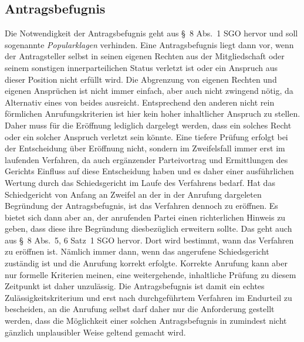 \subsection{Antragsbefugnis}
\label{Anrufung:Kriterien:Antragsbefugnis}
Die Notwendigkeit der Antragsbefugnis geht aus \S~8 Abs.~1 SGO hervor und soll sogenannte \emph{Popularklagen} verhinden.
Eine Antragsbefugnis liegt dann vor, wenn der Antragsteller selbst in seinen eigenen Rechten aus der Mitgliedschaft oder seinem sonstigen innerparteilichen Status verletzt ist oder ein Anspruch aus dieser Position nicht erfüllt wird.
Die Abgrenzung von eigenen Rechten und eigenen Ansprüchen ist nicht immer einfach, aber auch nicht zwingend nötig, da Alternativ eines von beides ausreicht.
Entsprechend den anderen nicht rein förmlichen Anrufungskriterien ist hier kein hoher inhaltlicher Anspruch zu stellen.
Daher muss für die Eröffnung lediglich dargelegt werden, dass ein solches Recht oder ein solcher Anspruch verletzt sein könnte.
Eine tiefere Prüfung erfolgt bei der Entscheidung über Eröffnung nicht, sondern im Zweifelsfall immer erst im laufenden Verfahren, da auch ergänzender Parteivortrag und Ermittlungen des Gerichts Einfluss auf diese Entscheidung haben und es daher einer ausführlichen Wertung durch das Schiedsgericht im Laufe des Verfahrens bedarf.
Hat das Schiedgericht von Anfang an Zweifel an der in der Anrufung dargeleten Begründung der Antragsbefugnis, ist das Verfahren dennoch zu eröffnen. Es bietet sich dann aber an, der anrufenden Partei einen richterlichen Hinweis zu geben, dass diese ihre Begründung diesbezüglich erweitern sollte.
Das geht auch aus \S~8 Abs.~5, 6 Satz~1 SGO hervor. Dort wird bestimmt, wann das Verfahren zu eröffnen ist. Nämlich immer dann, wenn das angerufene Schiedsgericht zuständig ist und die Anrufung korrekt erfolgte.
Korrekte Anrufung kann aber nur formelle Kriterien meinen, eine weitergehende, inhaltliche Prüfung zu diesem Zeitpunkt ist daher unzulässig.
Die Antragsbefugnis ist damit ein echtes Zulässigkeitskriterium und erst nach durchgeführtem Verfahren im Endurteil zu bescheiden, an die Anrufung selbst darf daher nur die Anforderung gestellt werden, dass die Möglichkeit einer solchen Antragsbefugnis in zumindest nicht gänzlich unplausibler Weise geltend gemacht wird.

